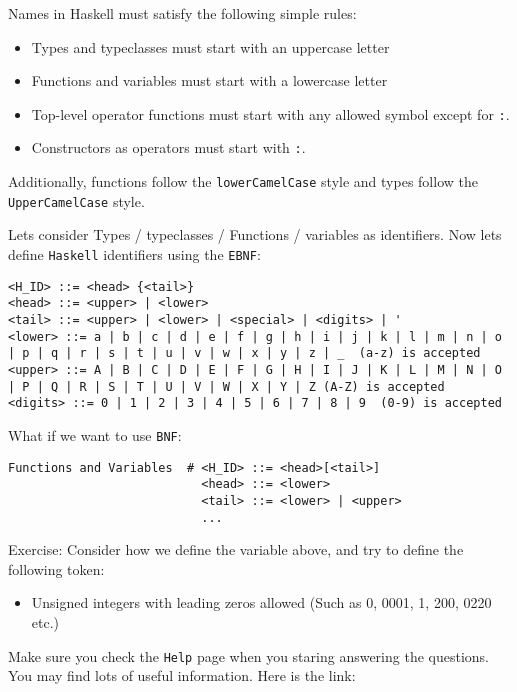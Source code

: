 \documentclass[11pt]{article}
\begin{document}
Names in Haskell must satisfy the following simple rules:

\begin{itemize}
\item Types and typeclasses must start with an uppercase letter
\item Functions and variables must start with a lowercase letter
\item Top-level operator functions must start with any allowed symbol except for
\texttt{:}.
\item Constructors as operators must start with \texttt{:}.
\end{itemize}

Additionally, functions follow the \texttt{lowerCamelCase} style and types follow the
\texttt{UpperCamelCase} style.

Lets consider Types / typeclasses / Functions / variables as identifiers. Now
lets define \texttt{Haskell} identifiers using the \texttt{EBNF}:

\begin{verbatim}
<H_ID> ::= <head> {<tail>}
<head> ::= <upper> | <lower>
<tail> ::= <upper> | <lower> | <special> | <digits> | '
<lower> ::= a | b | c | d | e | f | g | h | i | j | k | l | m | n | o | p | q | r | s | t | u | v | w | x | y | z | _  (a-z) is accepted
<upper> ::= A | B | C | D | E | F | G | H | I | J | K | L | M | N | O | P | Q | R | S | T | U | V | W | X | Y | Z (A-Z) is accepted
<digits> ::= 0 | 1 | 2 | 3 | 4 | 5 | 6 | 7 | 8 | 9  (0-9) is accepted
\end{verbatim}

What if we want to use \texttt{BNF}:

\begin{verbatim}
Functions and Variables  # <H_ID> ::= <head>[<tail>]
                           <head> ::= <lower>
                           <tail> ::= <lower> | <upper>
                           ...
\end{verbatim}

Exercise: Consider how we define the variable above, and try to  define the
following token:

\begin{itemize}
\item Unsigned integers with leading zeros allowed (Such as 0, 0001, 1, 200, 0220 etc.)
\end{itemize}

Make sure you check the \texttt{Help} page when you staring answering the questions.
You may find lots of useful information. Here is the link:
\end{document}
